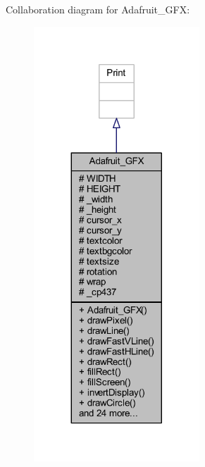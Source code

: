 Collaboration diagram for Adafruit\+\_\+\+G\+FX\+:\nopagebreak
\begin{figure}[H]
\begin{center}
\leavevmode
\includegraphics[width=176pt]{class_adafruit___g_f_x__coll__graph}
\end{center}
\end{figure}
